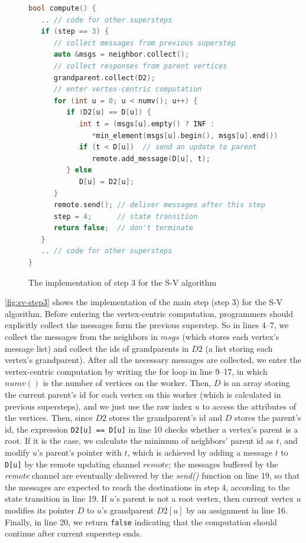 \documentclass{sokendai_thesis} %
\begin{document}
\begin{figure}[ht]
\centering
\vspace{-2ex}
\begin{lstlisting}[basicstyle=\small\ttfamily,language=c++]
bool compute() {
   .. // code for other supersteps
   if (step == 3) {
      // collect messages from previous superstep
      auto &msgs = neighbor.collect();
      // collect responses from parent vertices
      grandparent.collect(D2);
      // enter vertex-centric computation
      for (int u = 0; u < numv(); u++) {
         if (D2[u] == D[u]) {
            int t = (msgs[u].empty() ? INF : 
               *min_element(msgs[u].begin(), msgs[u].end()));
            if (t < D[u])  // send an update to parent
               remote.add_message(D[u], t);
         } else
            D[u] = D2[u];
      }
      remote.send(); // deliver messages after this step
      step = 4;      // state transition
      return false;  // don't terminate
   }
   .. // code for other supersteps
}
\end{lstlisting}
\vspace{-2ex}
\caption{The implementation of step 3 for the S-V algorithm}
\label{fig:sv-step3}
\end{figure}

\autoref{fig:sv-step3} shows the implementation of the main step (step 3) for the S-V algorithm.
Before entering the vertex-centric computation, programmers should explicitly collect the messages form the previous superstep.
So in lines 4--7, we collect the messages from the neighbors in $msgs$ (which stores each vertex's message list) and collect the ids of grandparents in $D2$ (a list storing each vertex's grandparent).
After all the necessary messages are collected, we enter the vertex-centric computation by writing the for loop in line 9--17, in which $numv()$ is the number of vertices on the worker.
Then, $D$ is an array storing the current parent's id for each vertex on this worker (which is calculated in previous supersteps), and we just use the raw index $u$ to access the attributes of the vertices.
Then, since $D2$ stores the grandparent's id and $D$ stores the parent's id, the expression \texttt{D2[u] == D[u]} in line 10 checks whether a vertex's parent is a root.
If it is the case, we calculate the minimum of neighbors' parent id as $t$, and modify $u$'s parent's pointer with $t$, which is achieved by adding a message $t$ to \texttt{D[u]} by the remote updating channel $remote$;
the messages buffered by the \emph{remote} channel are eventually delivered by the \emph{send()} function on line 19, so that the messages are expected to reach the destinations in step 4, according to the state transition in line 19.
If $u$'s parent is not a root vertex, then current vertex $u$ modifies its pointer $D$ to $u$'s grandparent $D2[u]$ by an assignment in line 16.
Finally, in line 20, we return \texttt{false} indicating that the computation should continue after current superstep ends.
\end{document}
